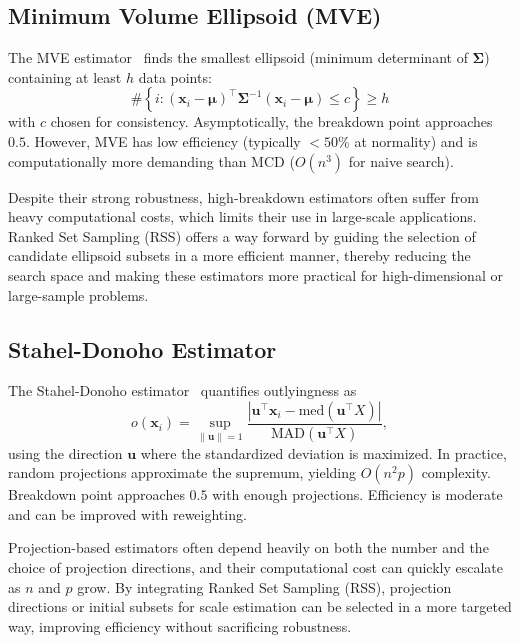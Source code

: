 \documentclass[12pt]{article}
\begin{document}
\subsection{Minimum Volume Ellipsoid (MVE)}
The MVE estimator~\cite{rousseeuw1985multivariate} finds the smallest ellipsoid (minimum determinant of $\bm{\Sigma}$) containing at least $h$ data points:
\[
\#\left\{ i : (\mathbf{x}_i - \bm{\mu})^\top \bm{\Sigma}^{-1} (\mathbf{x}_i - \bm{\mu}) \leq c \right\} \geq h
\]
with $c$ chosen for consistency.
Asymptotically, the breakdown point approaches $0.5$. However, MVE has low efficiency (typically $<50\%$ at normality) and is computationally more demanding than MCD ($O(n^3)$ for naive search).

Despite their strong robustness, high-breakdown estimators often suffer from heavy computational costs, which limits their use in large-scale applications. Ranked Set Sampling (RSS) offers a way forward by guiding the selection of candidate ellipsoid subsets in a more efficient manner, thereby reducing the search space and making these estimators more practical for high-dimensional or large-sample problems.
\subsection{Stahel-Donoho Estimator}
The Stahel-Donoho estimator~\cite{maronna2019robust} quantifies outlyingness as
\[
o(\mathbf{x}_i) = \sup_{\|\mathbf{u}\| = 1} \frac{|\mathbf{u}^\top \mathbf{x}_i - \text{med}(\mathbf{u}^\top X)|}{\text{MAD}(\mathbf{u}^\top X)},
\]
using the direction $\mathbf{u}$ where the standardized deviation is maximized. In practice, random projections approximate the supremum, yielding $O(n^2p)$ complexity.
Breakdown point approaches $0.5$ with enough projections. Efficiency is moderate and can be improved with reweighting.

Projection-based estimators often depend heavily on both the number and the choice of projection directions, and their computational cost can quickly escalate as $n$ and $p$ grow. By integrating Ranked Set Sampling (RSS), projection directions or initial subsets for scale estimation can be selected in a more targeted way, improving efficiency without sacrificing robustness.
\end{document}
